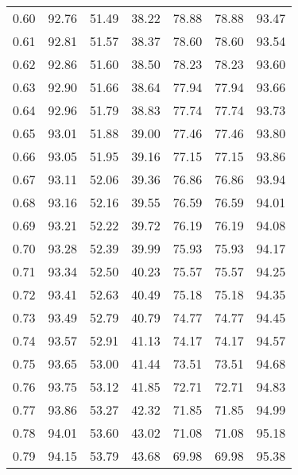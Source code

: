 \begin{tabular}{|c|c|c|c|c|c|c|}
      0.60 &     92.76 &     51.49 &      38.22 &   78.88 &      78.88 &         93.47 \\
      0.61 &     92.81 &     51.57 &      38.37 &   78.60 &      78.60 &         93.54 \\
      0.62 &     92.86 &     51.60 &      38.50 &   78.23 &      78.23 &         93.60 \\
      0.63 &     92.90 &     51.66 &      38.64 &   77.94 &      77.94 &         93.66 \\
      0.64 &     92.96 &     51.79 &      38.83 &   77.74 &      77.74 &         93.73 \\
      0.65 &     93.01 &     51.88 &      39.00 &   77.46 &      77.46 &         93.80 \\
      0.66 &     93.05 &     51.95 &      39.16 &   77.15 &      77.15 &         93.86 \\
      0.67 &     93.11 &     52.06 &      39.36 &   76.86 &      76.86 &         93.94 \\
      0.68 &     93.16 &     52.16 &      39.55 &   76.59 &      76.59 &         94.01 \\
      0.69 &     93.21 &     52.22 &      39.72 &   76.19 &      76.19 &         94.08 \\
      0.70 &     93.28 &     52.39 &      39.99 &   75.93 &      75.93 &         94.17 \\
      0.71 &     93.34 &     52.50 &      40.23 &   75.57 &      75.57 &         94.25 \\
      0.72 &     93.41 &     52.63 &      40.49 &   75.18 &      75.18 &         94.35 \\
      0.73 &     93.49 &     52.79 &      40.79 &   74.77 &      74.77 &         94.45 \\
      0.74 &     93.57 &     52.91 &      41.13 &   74.17 &      74.17 &         94.57 \\
      0.75 &     93.65 &     53.00 &      41.44 &   73.51 &      73.51 &         94.68 \\
      0.76 &     93.75 &     53.12 &      41.85 &   72.71 &      72.71 &         94.83 \\
      0.77 &     93.86 &     53.27 &      42.32 &   71.85 &      71.85 &         94.99 \\
      0.78 &     94.01 &     53.60 &      43.02 &   71.08 &      71.08 &         95.18 \\
      0.79 &     94.15 &     53.79 &      43.68 &   69.98 &      69.98 &         95.38 \\

\end{tabular}
